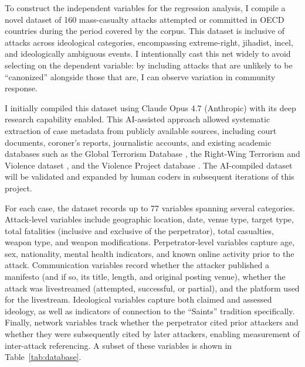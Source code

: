 \documentclass[12pt]{article}
\begin{document}
To construct the independent variables for the regression analysis, I compile a novel dataset of 160 mass-casualty attacks attempted or committed in OECD countries during the period covered by the corpus. This dataset is inclusive of attacks across ideological categories, encompassing extreme-right, jihadist, incel, and ideologically ambiguous events. I intentionally cast this net widely to avoid selecting on the dependent variable: by including attacks that are unlikely to be ``canonized'' alongside those that are, I can observe variation in community response.

I initially compiled this dataset using Claude Opus 4.7 (Anthropic) with its deep research capability enabled. This AI-assisted approach allowed systematic extraction of case metadata from publicly available sources, including court documents, coroner's reports, journalistic accounts, and existing academic databases such as the Global Terrorism Database \parencite{lafree2007introducing}, the Right-Wing Terrorism and Violence dataset \parencite{ravndal2016right}, and the Violence Project database \parencite{peterson2019violence}. The AI-compiled dataset will be validated and expanded by human coders in subsequent iterations of this project.

For each case, the dataset records up to 77 variables spanning several categories. Attack-level variables include geographic location, date, venue type, target type, total fatalities (inclusive and exclusive of the perpetrator), total casualties, weapon type, and weapon modifications. Perpetrator-level variables capture age, sex, nationality, mental health indicators, and known online activity prior to the attack. Communication variables record whether the attacker published a manifesto (and if so, its title, length, and original posting venue), whether the attack was livestreamed (attempted, successful, or partial), and the platform used for the livestream. Ideological variables capture both claimed and assessed ideology, as well as indicators of connection to the ``Saints'' tradition specifically. Finally, network variables track whether the perpetrator cited prior attackers and whether they were subsequently cited by later attackers, enabling measurement of inter-attack referencing. A subset of these variables is shown in Table~\ref{tab:database}.
\end{document}
